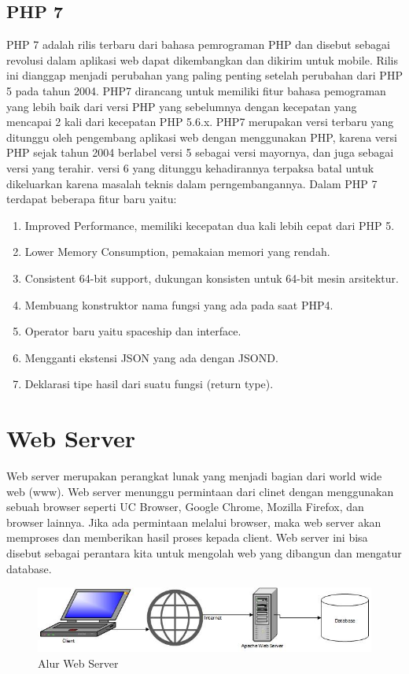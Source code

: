 \subsection{PHP 7}
PHP 7 adalah rilis terbaru dari bahasa pemrograman PHP dan disebut sebagai revolusi dalam aplikasi web dapat dikembangkan dan dikirim untuk mobile. Rilis ini dianggap menjadi perubahan yang paling penting setelah perubahan dari PHP 5 pada tahun 2004. PHP7 dirancang untuk memiliki fitur bahasa pemograman yang lebih baik dari versi PHP yang sebelumnya dengan kecepatan yang mencapai 2 kali dari kecepatan PHP 5.6.x. PHP7 merupakan versi terbaru yang ditunggu oleh pengembang aplikasi web dengan menggunakan PHP, karena versi PHP sejak tahun 2004 berlabel versi 5 sebagai versi mayornya, dan juga sebagai versi yang terahir. versi 6 yang ditunggu kehadirannya terpaksa batal untuk dikeluarkan karena masalah teknis dalam perngembangannya.
Dalam PHP 7 terdapat beberapa fitur baru yaitu:
\begin{enumerate}
\item Improved Performance, memiliki kecepatan dua kali lebih cepat dari PHP 5.
\item Lower Memory Consumption, pemakaian memori yang rendah.
\item Consistent 64-bit support, dukungan konsisten untuk 64-bit mesin arsitektur.
\item Membuang konstruktor nama fungsi yang ada pada saat PHP4.
\item Operator baru yaitu spaceship dan interface.
\item Mengganti ekstensi JSON yang ada dengan JSOND.
\item Deklarasi tipe hasil dari suatu fungsi (return type).
\end {enumerate}

\section{Web Server}
Web server merupakan perangkat lunak yang menjadi bagian dari world wide web (www). Web server menunggu permintaan dari clinet dengan menggunakan sebuah browser seperti UC Browser, Google Chrome, Mozilla Firefox, dan browser lainnya. Jika ada permintaan melalui browser, maka web server akan memproses dan memberikan hasil proses kepada client. Web server ini bisa disebut sebagai perantara kita untuk mengolah web yang dibangun dan mengatur database. 

\begin{figure}[h]
\centering
\includegraphics[scale=0.7]{figures/Alur-Web-Server}
\caption{Alur Web Server}
\label{webserver}
\end{figure}